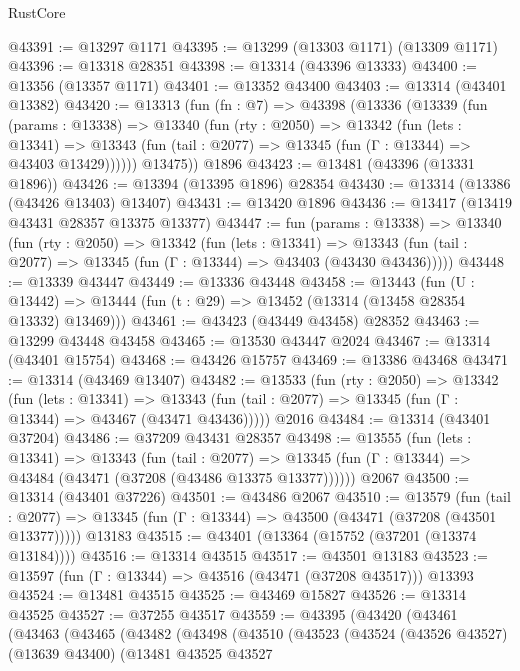 \begin{lexlean}{RustCore}
\begin{coremodule}
@43391 := @13297 @1171
@43395 := @13299 (@13303 @1171) (@13309 @1171)
@43396 := @13318 @28351
@43398 := @13314 (@43396 @13333)
@43400 := @13356 (@13357 @1171)
@43401 := @13352 @43400
@43403 := @13314 (@43401 @13382)
@43420 := @13313
    (fun (fn : @7) =>
    @43398
      (@13336
        (@13339
          (fun (params : @13338) =>
          @13340
            (fun (rty : @2050) =>
            @13342
              (fun (lets : @13341) =>
              @13343 (fun (tail : @2077) => @13345 (fun (Γ : @13344) => @43403 @13429))))))
        @13475))
    @1896
@43423 := @13481 (@43396 (@13331 @1896))
@43426 := @13394 (@13395 @1896) @28354
@43430 := @13314 (@13386 (@43426 @13403) @13407)
@43431 := @13420 @1896
@43436 := @13417 (@13419 @43431 @28357 @13375 @13377)
@43447 := fun (params : @13338) =>
  @13340
    (fun (rty : @2050) =>
    @13342
      (fun (lets : @13341) =>
      @13343 (fun (tail : @2077) => @13345 (fun (Γ : @13344) => @43403 (@43430 @43436)))))
@43448 := @13339 @43447
@43449 := @13336 @43448
@43458 := @13443
    (fun (U : @13442) => @13444 (fun (t : @29) => @13452 (@13314 (@13458 @28354 @13332) @13469)))
@43461 := @43423 (@43449 @43458) @28352
@43463 := @13299 @43448 @43458
@43465 := @13530 @43447 @2024
@43467 := @13314 (@43401 @15754)
@43468 := @43426 @15757
@43469 := @13386 @43468
@43471 := @13314 (@43469 @13407)
@43482 := @13533
    (fun (rty : @2050) =>
    @13342
      (fun (lets : @13341) =>
      @13343 (fun (tail : @2077) => @13345 (fun (Γ : @13344) => @43467 (@43471 @43436)))))
    @2016
@43484 := @13314 (@43401 @37204)
@43486 := @37209 @43431 @28357
@43498 := @13555
    (fun (lets : @13341) =>
    @13343
      (fun (tail : @2077) =>
      @13345 (fun (Γ : @13344) => @43484 (@43471 (@37208 (@43486 @13375 @13377))))))
    @2067
@43500 := @13314 (@43401 @37226)
@43501 := @43486 @2067
@43510 := @13579
    (fun (tail : @2077) => @13345 (fun (Γ : @13344) => @43500 (@43471 (@37208 (@43501 @13377)))))
    @13183
@43515 := @43401 (@13364 (@15752 (@37201 (@13374 @13184))))
@43516 := @13314 @43515
@43517 := @43501 @13183
@43523 := @13597 (fun (Γ : @13344) => @43516 (@43471 (@37208 @43517))) @13393
@43524 := @13481 @43515
@43525 := @43469 @15827
@43526 := @13314 @43525
@43527 := @37255 @43517
@43559 := @43395
    (@43420
      (@43461
        (@43463
          (@43465
            (@43482
              (@43498
                (@43510
                  (@43523
                    (@43524
                      (@43526 @43527)
                      (@13639 @43400)
                      (@13481
                        @43525
                        @43527

\end{coremodule}
\end{lexlean}
